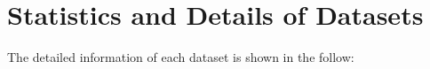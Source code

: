 \section{Statistics and Details of Datasets}
\label{appendix:datasets}



The detailed information of each dataset is shown in the follow:

